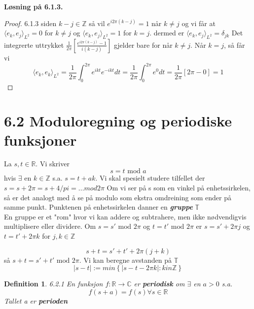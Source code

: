 \documentclass[a4paper,norsk]{article}
\newtheorem*{definition}{Definition}
\newenvironment{oppgave}[1]%
	{\trivlist{}\item\relax\textbf{Løsning på #1.}\medspace}%
	{\endtrivlist}
\begin{document}
\begin{oppgave}{6.1.3}
\begin{proof}{6.1.3}
siden $ k-j  \in \mathbb{Z}$ så vil $ e^{i 2\pi \left( k -j \right) } = 1 $ når $ k \neq j $  og vi får at $ \langle e_k, e_j \rangle_{ L^2 } = 0  $ for $ k\neq j $ og $ \langle e_k, e_j \rangle_{ L^2 } = 1  $ for $ k = j $. dermed er $ \langle e_k, e_j \rangle_{ L^2 } = \delta_{jk}  $ Det integrerte uttrykket $ \frac{ 1 }{ 2\pi } \left[ \frac{ e^{i2\pi \left( k - j \right)  } - 1}{ i \left( k-j \right)  } \right]  $ gjelder bare for når $ k \neq j $. Når $ k=j $, så får vi
\[
    \langle e_k, e_k \rangle_{ L^2 }  = \frac{ 1 }{ 2\pi } \int_{0}^{2\pi} e^{ikt} e^{-ikt}dt = \frac{ 1 }{ 2\pi } \int_{0}^{2\pi} e^0 dt = \frac{ 1 }{ 2\pi } \left[ 2\pi - 0 \right]   = 1
\]
\end{proof}   
\end{oppgave}



\section*{6.2 Moduloregning og periodiske funksjoner}

La $ s, t \in \mathbb{R} $. Vi skriver
\[
    s = t \text{ mod } a
\]
hvis $ \exists $ en $ k \in \mathbb{Z} $ s.a. $ s = t+ ak $. Vi skal spesielt studere tilfellet der $ s = s + 2\pi = s + 4 /pi = ... mod 2\pi $ 
Om vi ser på s som en vinkel på enhetssirkelen, så er det analogt med å se på modulo som ekstra omdreining som ender på samme punkt. Punktenen på enhetssirkelen danner en \textbf{\textit{gruppe}} $ \mathbb{T} $ \\

En gruppe er et "rom" hvor vi kan addere og subtrahere, men ikke nødvendigvis multiplisere eller dividere. Om $ s = s' \text{ mod } 2\pi$ og $ t = t' \text{ mod } 2\pi $ er $ s = s' + 2\pi j $ og $ t = t' + 2\pi k $ for $ j, k \in \mathbb{Z} $

\[
    s + t = s' + t' + 2\pi \left( j + k \right) 
\]
så $ s + t = s' + t' \text{ mod } 2 \pi $. Vi kan beregne avstanden på $ \mathbb{T} $
\[
    \left|  s - t \right| := min \left\{ \left| s - t - 2\pi k \right| : k in
    \mathbb{Z}  \right\} 
\]

\begin{definition}{6.2.1}
En funksjon $ f : \mathbb{R} \rightarrow \mathbb{C} $ er \textbf{\textit{periodisk}} om $ \exists $ en $ a > 0 $ s.a. 
\[
    f(s + a) = f(s) \forall s \in \mathbb{R}
\]
Tallet a er \textbf{\textit{perioden}} 
\end{definition}
\end{document}
